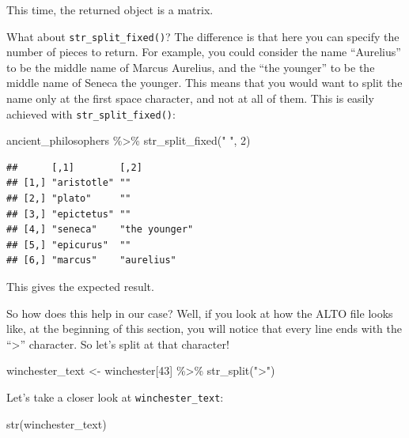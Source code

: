 \documentclass[
]{article}
\newenvironment{Shaded}{\begin{snugshade}}{\end{snugshade}}
\newcommand{\DecValTok}[1]{\textcolor[rgb]{0.00,0.00,0.81}{#1}}
\newcommand{\FunctionTok}[1]{\textcolor[rgb]{0.00,0.00,0.00}{#1}}
\newcommand{\NormalTok}[1]{#1}
\newcommand{\OtherTok}[1]{\textcolor[rgb]{0.56,0.35,0.01}{#1}}
\newcommand{\SpecialCharTok}[1]{\textcolor[rgb]{0.00,0.00,0.00}{#1}}
\newcommand{\StringTok}[1]{\textcolor[rgb]{0.31,0.60,0.02}{#1}}
\begin{document}
This time, the returned object is a matrix.

What about \texttt{str\_split\_fixed()}? The difference is that here you can specify the number of pieces
to return. For example, you could consider the name ``Aurelius'' to be the middle name of Marcus Aurelius,
and the ``the younger'' to be the middle name of Seneca the younger. This means that you would want
to split the name only at the first space character, and not at all of them. This is easily achieved
with \texttt{str\_split\_fixed()}:

\begin{Shaded}
\begin{Highlighting}[]
\NormalTok{ancient\_philosophers }\SpecialCharTok{\%\textgreater{}\%}
  \FunctionTok{str\_split\_fixed}\NormalTok{(}\StringTok{" "}\NormalTok{, }\DecValTok{2}\NormalTok{)}
\end{Highlighting}
\end{Shaded}

\begin{verbatim}
##      [,1]        [,2]         
## [1,] "aristotle" ""           
## [2,] "plato"     ""           
## [3,] "epictetus" ""           
## [4,] "seneca"    "the younger"
## [5,] "epicurus"  ""           
## [6,] "marcus"    "aurelius"
\end{verbatim}

This gives the expected result.

So how does this help in our case? Well, if you look at how the ALTO file looks like, at the beginning
of this section, you will notice that every line ends with the ``\textgreater{}'' character. So let's split at
that character!

\begin{Shaded}
\begin{Highlighting}[]
\NormalTok{winchester\_text }\OtherTok{\textless{}{-}}\NormalTok{ winchester[}\DecValTok{43}\NormalTok{] }\SpecialCharTok{\%\textgreater{}\%}
  \FunctionTok{str\_split}\NormalTok{(}\StringTok{"\textgreater{}"}\NormalTok{)}
\end{Highlighting}
\end{Shaded}

Let's take a closer look at \texttt{winchester\_text}:

\begin{Shaded}
\begin{Highlighting}[]
\FunctionTok{str}\NormalTok{(winchester\_text)}
\end{Highlighting}
\end{Shaded}
\end{document}
